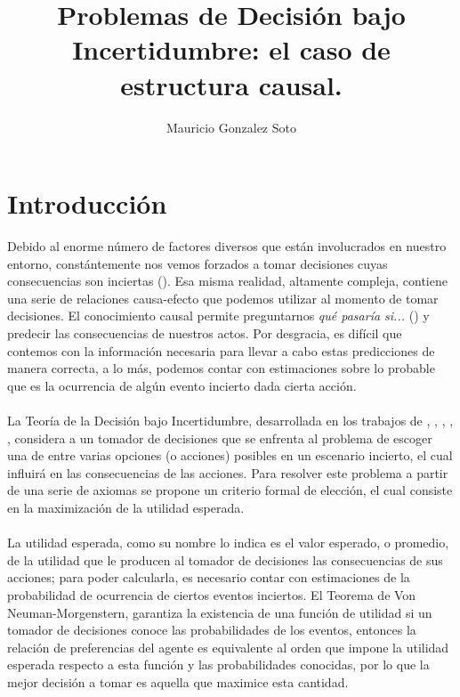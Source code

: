 \documentclass[11pt]{article}
\title{Problemas de Decisión bajo Incertidumbre: el caso de estructura causal.}
\author{Mauricio Gonzalez Soto}
\theoremstyle{plain}
\begin{document}
\maketitle
\section{Introducción}
Debido al enorme número de factores diversos que están involucrados en nuestro entorno, constántemente nos vemos forzados a tomar decisiones cuyas consecuencias son inciertas (\cite{danks2014unifying}). Esa misma realidad, altamente compleja, contiene una serie de relaciones causa-efecto que podemos utilizar al momento de tomar decisiones. El conocimiento causal permite preguntarnos  \textit{qué pasaría si...} (\cite{stalnaker2016knowledge}) y predecir las consecuencias de nuestros actos. Por desgracia, es difícil que contemos con la información necesaria para llevar a cabo estas predicciones de manera correcta, a lo más, podemos contar con estimaciones sobre lo probable que es la ocurrencia de algún evento incierto dada cierta acción.\\
\\
\indent La Teoría de la Decisión bajo Incertidumbre, desarrollada en los trabajos de \cite{von1944theory}, \cite{definetti1930}, \cite{definetti1937}, \cite{savage1954the}, \cite{bernardo2000bayesian}, considera a un tomador de decisiones que se enfrenta al problema de escoger una de entre varias opciones (o acciones) posibles en un escenario incierto, el cual influirá en las consecuencias de las acciones. Para resolver este problema a partir de una serie de axiomas se propone un criterio formal de elección, el cual consiste en la maximización de la utilidad esperada.\\
\\
\indent La utilidad esperada, como su nombre lo indica es el valor esperado, o promedio, de la utilidad que le producen al tomador de decisiones las consecuencias de sus acciones; para poder calcularla, es necesario contar con estimaciones de la probabilidad de ocurrencia de ciertos eventos inciertos. El Teorema de Von Neuman-Morgenstern, garantiza la existencia de una función de utilidad si un tomador de decisiones conoce las probabilidades de los eventos, entonces  la relación de preferencias del agente es equivalente al orden que impone la utilidad esperada respecto a esta función y las probabilidades conocidas, por lo que la mejor decisión a tomar es aquella que maximice esta cantidad.\\
\end{document}
